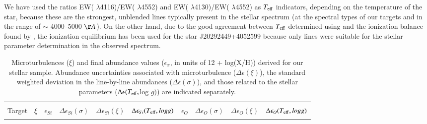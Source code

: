 \documentclass{aa} %
\begin{document}
We have used  the ratios EW( $\lambda$4116)/EW( $\lambda$4552) and EW( $\lambda$4130)/EW( $\lambda$4552) as $T_{\rm eff}$ indicators, depending on the temperature of the star,  because these are the strongest, unblended lines typically present in the stellar spectrum (at the spectral types of our targets  and in the range of $\sim$ 4000–5000 $\AA$). 
On the other hand, due to the good agreement between $T_{\rm eff}$ determined using  and the  ionization balance found by \cite{ssimon10},  the  ionization equilibrium has been used for the star J20292449+4052599 because only  lines were suitable for the stellar parameter determination in the observed spectrum.

\begin{table*}[t!]
	\centering
	\caption{ Microturbulences ($\xi$) and final abundance values ($\epsilon_{x}$, in units of 12 + log(X/H)) derived for our stellar sample. Abundance uncertainties associated with microturbulence ($\Delta\epsilon(\xi)$), the standard weighted deviation in the line-by-line abundances ($\Delta\epsilon(\sigma)$), and those related to the stellar parameters ($\Delta\epsilon(T_{\rm eff},$log $g)$) are indicated separately.}
	\label{table3b}
		\begin{tabular}{lccccccccc}
		\hline   
		\hline\\[-1.8ex]
    	\small{Target}& \small{$\xi$} & \small{$\epsilon_{Si}$}& \small{$\Delta\epsilon_{Si}(\sigma)$}& \small{$\Delta\epsilon_{Si}(\xi)$}& \small{$\Delta\epsilon_{Si}(T_{\rm eff},log g)$} & \small{$\epsilon_{O}$}& \small{$\Delta\epsilon_{O}(\sigma)$}& \small{$\Delta\epsilon_{O}(\xi)$}& \small{$\Delta\epsilon_{O}(T_{\rm eff},log g)$}  \\
 \hline \\[-1.5ex]


\end{tabular}
\end{table*}
\end{document}

